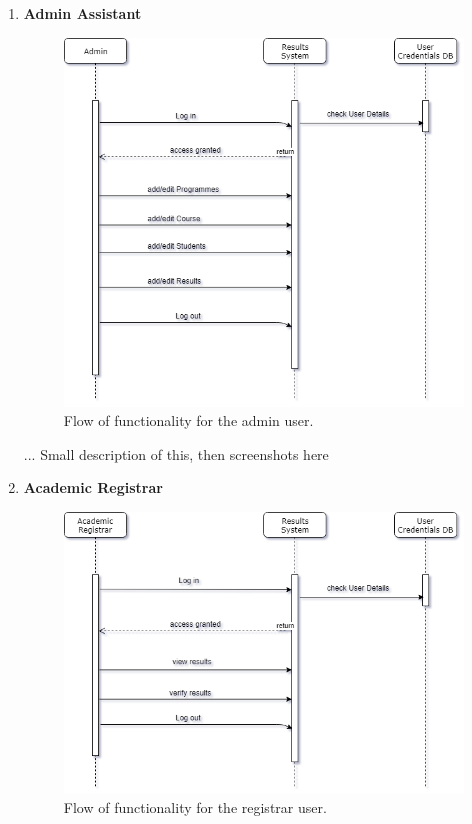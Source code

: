 \begin{enumerate}
\item \textbf{Admin Assistant}
\begin{figure}[H]
\caption{Flow of functionality for the admin user.}
\includegraphics[scale=0.5]{images/SequenceAdmin.png}
\end{figure}
... Small description of this, then screenshots here
\item \textbf{Academic Registrar}
\begin{figure}[H]
\caption{Flow of functionality for the registrar user.}
\includegraphics[scale=0.5]{images/SequenceRegistrar.png}

\end{figure}
\end{enumerate}
